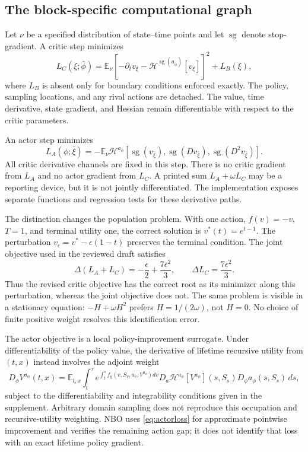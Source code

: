 \documentclass[ecta,draft]{econsocart}
\theoremstyle{definition}
\theoremstyle{remark}
\newcommand{\E}{\mathbb E}
\newcommand{\HH}{\mathcal H}
\newcommand{\sg}{\operatorname{sg}}
\begin{document}
\subsection{The block-specific computational graph}
Let $\nu$ be a specified distribution of state--time points and let $\sg$ denote stop-gradient. A critic step minimizes
\begin{equation}\label{eq:criticloss}
 L_C(\xi;\bar\phi)=\E_\nu\left[-\partial_t v_\xi-
                 \HH^{\sg(a_{\bar\phi})}[v_\xi]\right]^2+L_B(\xi),
\end{equation}
where $L_B$ is absent only for boundary conditions enforced exactly. The policy, sampling locations, and any rival actions are detached. The value, time derivative, state gradient, and Hessian remain differentiable with respect to the critic parameters.

An actor step minimizes
\begin{equation}\label{eq:actorloss}
 L_A(\phi;\bar\xi)=-\E_\nu\HH^{a_\phi}
 [\sg(v_{\bar\xi}),\sg(Dv_{\bar\xi}),\sg(D^2v_{\bar\xi})].
\end{equation}
All critic derivative channels are fixed in this step. There is no critic gradient from $L_A$ and no actor gradient from $L_C$. A printed sum $L_A+\omega L_C$ may be a reporting device, but it is not jointly differentiated. The implementation exposes separate functions and regression tests for these derivative paths.

The distinction changes the population problem. With one action, $f(v)=-v$, $T=1$, and terminal utility one, the correct solution is $v^*(t)=e^{t-1}$. The perturbation $v_\epsilon=v^*-\epsilon(1-t)$ preserves the terminal condition. The joint objective used in the reviewed draft satisfies
\begin{equation}\label{eq:counterexample}
 \Delta(L_A+L_C)=-\frac\epsilon2+\frac{7\epsilon^2}{3},
 \qquad \Delta L_C=\frac{7\epsilon^2}{3}.
\end{equation}
Thus the revised critic objective has the correct root as its minimizer along this perturbation, whereas the joint objective does not. The same problem is visible in a stationary equation: $-H+\omega H^2$ prefers $H=1/(2\omega)$, not $H=0$. No choice of finite positive weight resolves this identification error.

The actor objective is a local policy-improvement surrogate. Under differentiability of the policy value, the derivative of lifetime recursive utility from $(t,x)$ instead involves the adjoint weight
\begin{equation}\label{eq:gradient}
 D_\phi V^{a_\phi}(t,x)=\E_{t,x}\int_t^\tau
 e^{\int_t^s f_y(v,S_v,a_v,V^{a_\phi})dv}
 D_a\HH^{a_\phi}[V^{a_\phi}](s,S_s)D_\phi a_\phi(s,S_s)\,ds,
\end{equation}
subject to the differentiability and integrability conditions given in the supplement. Arbitrary domain sampling does not reproduce this occupation and recursive-utility weighting. NBO uses \eqref{eq:actorloss} for approximate pointwise improvement and verifies the remaining action gap; it does not identify that loss with an exact lifetime policy gradient.
\end{document}
